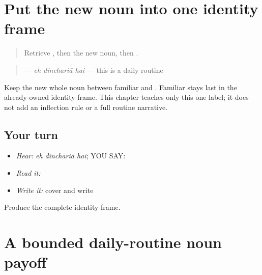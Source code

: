 \section[\texorpdfstring{\pa{ਇਹ} \pa{ਦਿਨਚਰਿਆ} \pa{ਹੈ} (eh dinchariyaa hai)}{ਇਹ ਦਿਨਚਰਿਆ ਹੈ (eh dinchariyaa hai)}]{Put the new noun into one identity frame}

\label{lesson:PA-C197-routine-label}



\begin{quote}
Retrieve \textbf{}, then the new noun, then \textbf{}.
\end{quote}

\begin{grammarlens}[title={Grammar Lens}]
\begin{quote}
\textbf{  } — \emph{eh dinchariā hai} — this is a daily routine
\end{quote}

Keep the new whole noun between familiar \textbf{} and \textbf{}. Familiar \textbf{} stays last in the already-owned identity frame. This chapter teaches only this one label; it does not add an inflection rule or a full routine narrative.
\end{grammarlens}

\subsection*{Your turn}
\begin{itemize}
\raggedright
  \item \emph{Hear:} \emph{eh dinchariā hai}; YOU SAY: \textbf{  }
  \item \emph{Read it:} \textbf{  }
  \item \emph{Write it:} cover and write \textbf{  }
\end{itemize}

\begin{tcolorbox}[breakable,colback=teal!4,colframe=teal!35!black,title={Before you move on}]
Produce the complete identity frame.
\end{tcolorbox}
\section[\texorpdfstring{\pa{ਇਹ} \pa{ਦਿਨਚਰਿਆ} \pa{ਹੈ} (eh dinchariyaa hai)}{ਇਹ ਦਿਨਚਰਿਆ ਹੈ (eh dinchariyaa hai)}]{A bounded daily-routine noun payoff}

